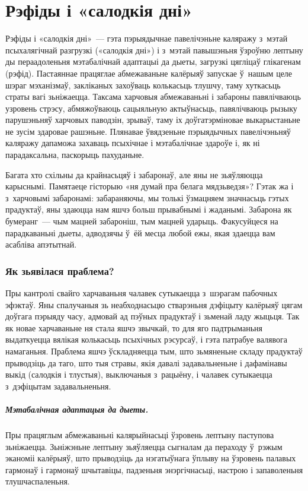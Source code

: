\chapter{Рэфіды і «салодкія дні»}

Рэфіды і «салодкія дні»~--- гэта пэрыядычнае павелічэньне каляражу з~мэтай псыхалягічнай разгрузкі («салодкія дні») і з~мэтай павышэньня ўзроўню лептыну ды пераадоленьня мэтабалічнай адаптацыі да дыеты, загрузкі цягліцаў глікагенам (рэфід). Пастаяннае працяглае абмежаваньне калёрыяў запускае ў~нашым целе шэраг мэханізмаў, закліканых захоўваць колькасьць тлушчу, таму хуткасьць страты вагі зьніжаецца. Таксама харчовыя абмежаваньні і забароны павялічваюць узровень стрэсу, абмяжоўваюць сацыяльную актыўнасьць, павялічваюць рызыку парушэньняў харчовых паводзін, зрываў, таму іх доўгатэрміновае выкарыстаньне не зусім здаровае рашэньне. Плянавае ўвядзеньне пэрыядычных павелічэньняў каляражу дапаможа захаваць псыхічнае і мэтабалічнае здароўе і, як ні парадаксальна, паскорыць пахуданьне.

Багата хто схільны да крайнасьцяў і забаронаў, але яны не зьяўляюцца карыснымі. Памятаеце гісторыю «ня думай пра белага мядзьведзя»? Гэтак жа і з~харчовымі забаронамі: забараняючы, мы толькі ўзмацняем значнасьць гэтых прадуктаў, яны здаюцца нам яшчэ больш прывабнымі і жаданымі. Забарона як бумеранг~--- чым мацней забароніш, тым мацней ударыць. Факусуйцеся на парадкаваньні дыеты, адводзячы ў~ёй месца любой ежы, якая здаецца вам асабліва апэтытнай.

\subsection{Як зьявілася праблема?}

Пры кантролі свайго харчаваньня чалавек сутыкаецца з~шэрагам пабочных эфэктаў. Яны спалучаныя зь неабходнасьцю стварэньня дэфіцыту калёрыяў цягам доўгага пэрыяду часу, адмовай ад пэўных прадуктаў і зьменай ладу жыцьця. Так як новае харчаваньне ня стала яшчэ звычкай, то для яго падтрыманьня выдаткуецца вялікая колькасьць псыхічных рэсурсаў, і гэта патрабуе валявога намаганьня. Праблема яшчэ ўскладняецца тым, што зьмяненьне складу прадуктаў прыводзіць да таго, што тыя стравы, якія давалі задавальненьне і дафамінавы выкід (салодкія і тлустыя), выключаныя з~рацыёну, і чалавек сутыкаецца з~дэфіцытам задавальненьня.

\paragraph{Мэтабалічная адаптацыя да дыеты.}
Пры працяглым абмежаваньні калярыйнасьці ўзровень лептыну паступова зьніжаецца. Зьніжэньне лептыну зьяўляецца сыгналам да пераходу ў~рэжым эканоміі калёрыяў, што прыводзіць да нэгатыўнага ўплыву на ўзровень палавых гармонаў і гармонаў шчытавіцы, падзеньня энэргічнасьці, настрою і запаволеньня тлушчаспаленьня.

